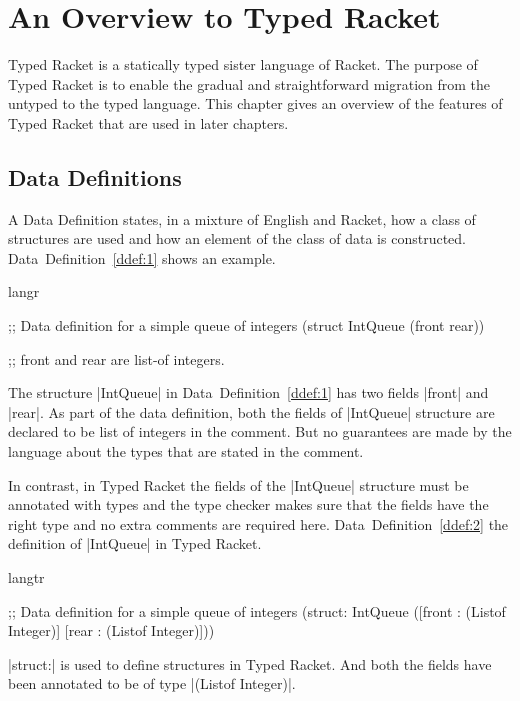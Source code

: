 \chapter{An Overview to Typed Racket}
Typed Racket \citep{thf-popl, th-diss} is a statically typed sister
language of Racket. The purpose of Typed Racket is to enable the gradual
and straightforward migration from the untyped to the typed
language. This chapter gives an overview of the features of Typed Racket
that are used in later chapters.

\section{Data Definitions}
\label{sec:datadef}
\noindent
A Data Definition states, in a mixture of English and Racket, how a
class of structures are used and how an element of the class of data is
constructed. Data~Definition~\ref{ddef:1} shows an example.

\begin{defexample}
\begin{schemedisplay}
  langr
 
  ;; Data definition for a simple queue of integers
  (struct IntQueue 
    (front rear))
 
  ;; front and rear are list-of integers.
\end{schemedisplay}
\label{ddef:1}
\end{defexample}


\noindent
The structure \scheme|IntQueue| in Data~Definition~\ref{ddef:1} has two
fields \scheme|front| and \scheme|rear|. As part of the data definition,
both the fields of \scheme|IntQueue| structure are declared to be list
of integers in the comment. But no guarantees are made by the language
about the types that are stated in the comment.


In contrast, in Typed Racket the fields of the \scheme|IntQueue|
structure must be annotated with types and the type checker makes sure
that the fields have the right type and no extra comments are required
here. Data~Definition~\ref{ddef:2} the definition of \scheme|IntQueue|
in Typed Racket.

\begin{defexample}
\begin{schemedisplay}
  langtr

  ;; Data definition for a simple queue of integers
  (struct: IntQueue 
    ([front : (Listof Integer)]
     [rear  : (Listof Integer)]))

\end{schemedisplay}
\label{ddef:2}
\end{defexample}
\noindent
\scheme|struct:| is used to define structures in Typed Racket. And both
the fields have been annotated to be of type \scheme|(Listof Integer)|.

